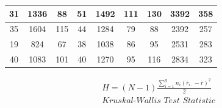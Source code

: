 \documentclass[12pt]{article}
\begin{document}
\begin{table}[h!]
\begin{tabular}{|ccccccccc|}
\multicolumn{1}{|c|}{31}         & \multicolumn{1}{c|}{1336}       & \multicolumn{1}{c|}{88}       & \multicolumn{1}{c|}{51}         & \multicolumn{1}{c|}{1492}       & \multicolumn{1}{c|}{111}      & \multicolumn{1}{c|}{130}        & \multicolumn{1}{c|}{3392}       & 358      \\ \hline
\multicolumn{1}{|c|}{35}         & \multicolumn{1}{c|}{1604}       & \multicolumn{1}{c|}{115}      & \multicolumn{1}{c|}{44}         & \multicolumn{1}{c|}{1284}       & \multicolumn{1}{c|}{79}       & \multicolumn{1}{c|}{88}         & \multicolumn{1}{c|}{2392}       & 257      \\ \hline
\multicolumn{1}{|c|}{19}         & \multicolumn{1}{c|}{824}        & \multicolumn{1}{c|}{67}       & \multicolumn{1}{c|}{38}         & \multicolumn{1}{c|}{1038}       & \multicolumn{1}{c|}{86}       & \multicolumn{1}{c|}{95}         & \multicolumn{1}{c|}{2531}       & 283      \\ \hline
\multicolumn{1}{|c|}{40}         & \multicolumn{1}{c|}{1083}       & \multicolumn{1}{c|}{101}      & \multicolumn{1}{c|}{40}         & \multicolumn{1}{c|}{1270}       & \multicolumn{1}{c|}{95}       & \multicolumn{1}{c|}{116}        & \multicolumn{1}{c|}{2834}       & 323      \\ \hline
\end{tabular}
\end{table}
\clearpage
\begin{align*} 
	H=(N-1)\frac{\sum\limits_{i=1}^g n_{i}(\bar{r}_{i\cdot}-\bar{r})^2}{2} \\
	\textit{Kruskal-Wallis Test Statistic} \\ 
\end{align*}
\end{document}
